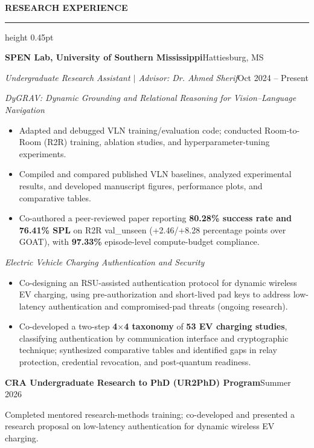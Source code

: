 \documentclass[11pt]{article}
\newcommand{\cvsection}[1]{%
  \Needspace{4\baselineskip}%
  \par\addvspace{8.5pt}%
  \noindent\textbf{\MakeUppercase{#1}}\par\nobreak
  \vspace{2pt}\hrule height 0.45pt\relax\nobreak\vspace{4pt}%
}
\newcommand{\entryheading}[4]{%
  \textbf{#1}\hfill #2\par
  \textit{#3}\hfill #4\par
}
\newcommand{\subentry}[2]{\par\noindent\textbf{#1}\hfill #2\par}
\newcommand{\researchtopic}[1]{\par\vspace{3pt}\noindent\textit{#1}\par}
\begin{document}
\cvsection{Research Experience}
\entryheading{SPEN Lab, University of Southern Mississippi}{Hattiesburg, MS}
  {Undergraduate Research Assistant $\vert$ Advisor: Dr. Ahmed Sherif}{Oct 2024 -- Present}
\researchtopic{DyGRAV: Dynamic Grounding and Relational Reasoning for Vision--Language Navigation}
\begin{itemize}
  \item Adapted and debugged VLN training/evaluation code; conducted Room-to-Room (R2R)
  training, ablation studies, and hyperparameter-tuning experiments.
  \item Compiled and compared published VLN baselines, analyzed experimental results,
  and developed manuscript figures, performance plots, and comparative tables.
  \item Co-authored a peer-reviewed paper reporting \textbf{80.28\% success rate and 76.41\% SPL} on
  R2R val\_unseen (+2.46/+8.28 percentage points over GOAT), with
  \textbf{97.33\%} episode-level compute-budget compliance.
\end{itemize}
\researchtopic{Electric Vehicle Charging Authentication and Security}
\begin{itemize}
  \item Co-designing an RSU-assisted authentication protocol for dynamic wireless EV
  charging, using pre-authorization and short-lived pad keys to address low-latency
  authentication and compromised-pad threats (ongoing research).
  \item Co-developed a two-step \textbf{4$\times$4 taxonomy} of \textbf{53 EV charging studies},
  classifying authentication by communication interface and cryptographic technique;
  synthesized comparative tables and identified gaps in relay protection, credential
  revocation, and post-quantum readiness.
\end{itemize}
\vspace{2pt}
\subentry{CRA Undergraduate Research to PhD (UR2PhD) Program}{Summer 2026}
Completed mentored research-methods training; co-developed and presented a research
proposal on low-latency authentication for dynamic wireless EV charging.
\end{document}
